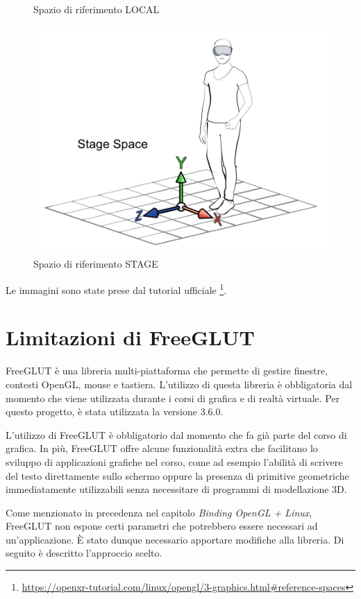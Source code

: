 \documentclass[twoside]{supsistudent}
\begin{document}
\begin{figure}[H]
\begin{minipage}{.3\textwidth}
    \caption{Spazio di riferimento LOCAL}
  \end{minipage}
  \begin{minipage}{.3\textwidth}
    \centering
    \includegraphics[width=.9\linewidth]{resources/stage_space.png}
    \caption{Spazio di riferimento STAGE}
  \end{minipage}
\end{figure}

Le immagini sono state prese dal tutorial ufficiale \footnote{\url{https://openxr-tutorial.com/linux/opengl/3-graphics.html\#reference-spaces}}.

\section{Limitazioni di FreeGLUT}

FreeGLUT è una libreria multi-piattaforma che permette di gestire finestre, contesti OpenGL, mouse e tastiera. L'utilizzo di questa libreria è obbligatoria dal momento che viene utilizzata durante i corsi di grafica e di realtà virtuale. Per questo progetto, è stata utilizzata la versione 3.6.0.

L'utilizzo di FreeGLUT è obbligatorio dal momento che fa già parte del corso di grafica. In più, FreeGLUT offre alcune funzionalità extra che facilitano lo sviluppo di applicazioni grafiche nel corso, come ad esempio l'abilità di scrivere del testo direttamente sullo schermo oppure la presenza di primitive geometriche immediatamente utilizzabili senza necessitare di programmi di modellazione 3D.

Come menzionato in precedenza nel capitolo \textit{Binding OpenGL + Linux}, FreeGLUT non espone certi parametri che potrebbero essere necessari ad un'applicazione. È stato dunque necessario apportare modifiche alla libreria. Di seguito è descritto l'approccio scelto.
\end{document}

